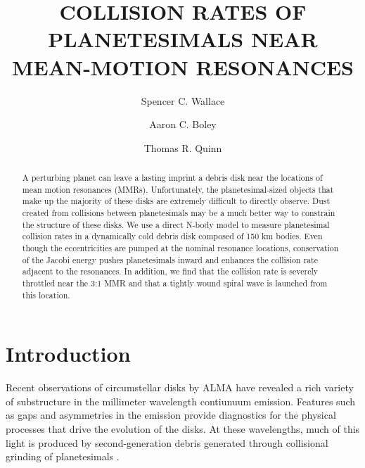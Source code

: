 \documentclass[twocolumn]{aastex63}
\begin{document}
\title{COLLISION RATES OF PLANETESIMALS NEAR MEAN-MOTION RESONANCES}

\author{Spencer C. Wallace}

\author{Aaron C. Boley}

\author{Thomas R. Quinn}

\begin{abstract}
A perturbing planet can leave a lasting imprint a debris disk near the locations of mean motion resonances (MMRs). Unfortunately,
the planetesimal-sized objects that make up the majority of these disks are extremely difficult to directly observe. Dust created from
collisions between planetesimals may be a much better way to constrain the structure of these disks. We use a direct N-body model
to measure planetesimal collision rates in a dynamically cold debris disk composed of 150 km bodies. Even though the eccentricities
are pumped at the nominal resonance locations, conservation of the Jacobi energy pushes planetesimals inward and enhances the
collision rate adjacent to the resonances. In addition, we find that the collision rate is severely throttled near the 3:1 MMR and that a
tightly wound spiral wave is launched from this location.
\end{abstract}

\section{Introduction} \label{sec:intro}


Recent observations of circumstellar disks by ALMA have revealed a rich variety of substructure in the millimeter wavelength
contiunuum emission. Features such as gaps and asymmetries 
\citep{2015ApJ...808L...3A, 2016Sci...353.1519P, PhysRevLett.117.251101, 2016ApJ...820L..40A, 2016Natur.535..258C} in the 
emission provide diagnostics for the physical processes that drive the evolution of the disks. At these wavelengths, much of this light 
is produced by second-generation debris generated through collisional grinding of planetesimals
\citep[see][]{2008ARA&A..46..339W}. 
\end{document}
